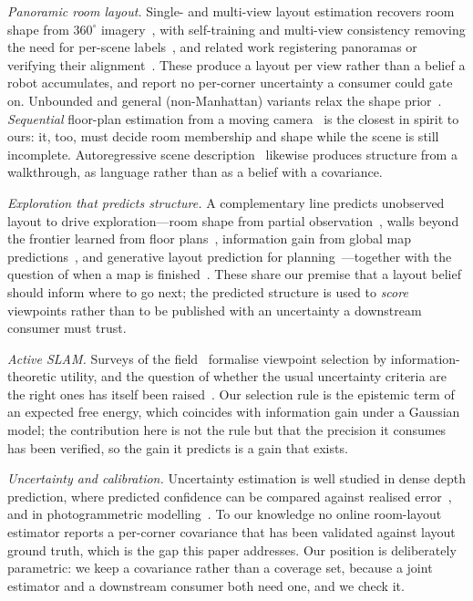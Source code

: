 \documentclass[conference,letterpaper,10pt]{IEEEtran}
\begin{document}
\emph{Panoramic room layout.} Single- and multi-view layout estimation recovers room shape from
$360^\circ$ imagery~\cite{hu2021mvlayoutnet,su2022gprnet,wangpsmnet}, with self-training and
multi-view consistency removing the need for per-scene labels~\cite{solarte2022mlc,
solarte2024raycasting}, and related work registering panoramas or verifying their
alignment~\cite{hutchcroftcovispose,lambertsalve}. These produce a layout per view rather than a
belief a robot accumulates, and report no per-corner uncertainty a consumer could gate on. Unbounded
and general (non-Manhattan) variants relax the shape prior~\cite{howardjenkins2019unconstrained,
fayyazsanaviu2rle,bieri2025houselayout3d}. \emph{Sequential} floor-plan estimation from a moving
camera~\cite{solarte2022dfpe} is the closest in spirit to ours: it, too, must decide room
membership and shape while the scene is still incomplete. Autoregressive scene
description~\cite{avetisyan2024scenescript} likewise produces structure from a walkthrough, as
language rather than as a belief with a covariance.

\emph{Exploration that predicts structure.} A complementary line predicts unobserved layout to
drive exploration---room shape from partial observation~\cite{luperto2020exploration}, walls beyond
the frontier learned from floor plans~\cite{ericson2024floorist}, information gain from global map
predictions~\cite{ho2025mapex}, and generative layout prediction for
planning~\cite{wang2025cogniplan}---together with the question of when a map is
finished~\cite{luperto2024mapcompleteness}. These share our premise that a layout belief should
inform where to go next; the predicted structure is used to \emph{score} viewpoints rather than to be
published with an uncertainty a downstream consumer must trust.

\emph{Active SLAM.} Surveys of the field~\cite{ahmed2023aslamreview,placed2023survey} formalise
viewpoint selection by information-theoretic utility, and the question of whether the usual
uncertainty criteria are the right ones has itself been raised~\cite{placed2022enough}. Our selection
rule is the epistemic term of an expected free energy, which coincides with information gain under a
Gaussian model; the contribution here is not the rule but that the precision it consumes has been
verified, so the gain it predicts is a gain that exists.

\emph{Uncertainty and calibration.} Uncertainty estimation is well studied in dense depth
prediction, where predicted confidence can be compared against realised error~\cite{poggiuncertainty},
and in photogrammetric modelling~\cite{jarzabek2022uncertainty,liu2024point2building}. To our
knowledge no online room-layout estimator reports a per-corner covariance that has been validated
against layout ground truth, which is the gap this paper addresses. Our position is deliberately
parametric: we keep a covariance rather than a coverage set, because a joint estimator and a
downstream consumer both need one, and we check it.
\end{document}
